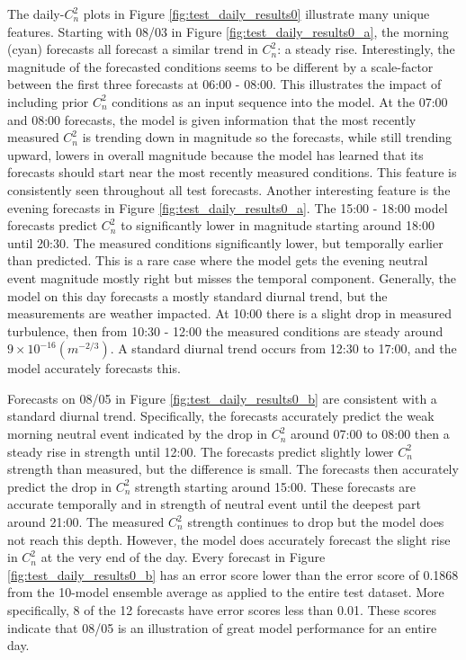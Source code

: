 The daily-$C_{n}^{2}$ plots in Figure \ref{fig:test_daily_results0} illustrate many unique features. Starting with 08/03 in Figure \ref{fig:test_daily_results0_a}, the morning (cyan) forecasts all forecast a similar trend in $C_{n}^{2}$: a steady rise. Interestingly, the magnitude of the forecasted conditions seems to be different by a scale-factor between the first three forecasts at 06:00 - 08:00. This illustrates the impact of including prior $C_{n}^{2}$ conditions as an input sequence into the model. At the 07:00 and 08:00 forecasts, the model is given information that the most recently measured $C_{n}^{2}$ is trending down in magnitude so the forecasts, while still trending upward, lowers in overall magnitude because the model has learned that its forecasts should start near the most recently measured conditions. This feature is consistently seen throughout all test forecasts. Another interesting feature is the evening forecasts in Figure \ref{fig:test_daily_results0_a}. The 15:00 - 18:00 model forecasts predict $C_{n}^{2}$ to significantly lower in magnitude starting around 18:00 until 20:30. The measured conditions significantly lower, but temporally earlier than predicted. This is a rare case where the model gets the evening neutral event magnitude mostly right but misses the temporal component. Generally, the model on this day forecasts a mostly standard diurnal trend, but the measurements are weather impacted. At 10:00 there is a slight drop in measured turbulence, then from 10:30 - 12:00 the measured conditions are steady around $9 \times 10^{-16} (m^{-2/3})$. A standard diurnal trend occurs from 12:30 to 17:00, and the model accurately forecasts this.

Forecasts on 08/05 in Figure \ref{fig:test_daily_results0_b} are consistent with a standard diurnal trend. Specifically, the forecasts accurately predict the weak morning neutral event indicated by the drop in $C_{n}^{2}$ around 07:00 to 08:00 then a steady rise in strength until 12:00. The forecasts predict slightly lower $C_{n}^{2}$ strength than measured, but the difference is small. The forecasts then accurately predict the drop in $C_{n}^{2}$ strength starting around 15:00. These forecasts are accurate temporally and in strength of neutral event until the deepest part around 21:00. The measured $C_{n}^{2}$ strength continues to drop but the model does not reach this depth. However, the model does accurately forecast the slight rise in $C_{n}^{2}$ at the very end of the day. Every forecast in Figure \ref{fig:test_daily_results0_b} has an error score lower than the error score of 0.1868 from the 10-model ensemble average as applied to the entire test dataset. More specifically, 8 of the 12 forecasts have error scores less than 0.01. These scores indicate that 08/05 is an illustration of great model performance for an entire day.

